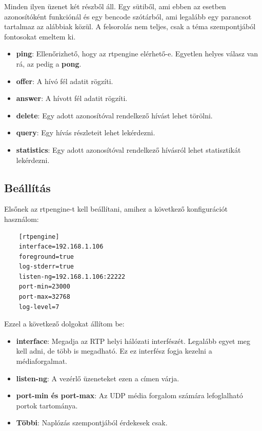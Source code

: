 Minden ilyen üzenet két részből áll. Egy sütiből, ami ebben az esetben azonosítóként
funkciónál és egy bencode szótárból, ami legalább egy parancsot tartalmaz az 
alábbiak közül. A felsorolás nem teljes, csak a téma szempontjából fontosokat 
emeltem ki.

\begin{itemize}
	\item \textbf{ping}: Ellenőrizhető, hogy az rtpengine elérhető-e. Egyetlen helyes 
	válasz van rá, az pedig a \textbf{pong}.
	\item \textbf{offer}: A hívó fél adatit rögzíti.
	\item \textbf{answer}: A hívott fél adatit rögzíti. 
	\item \textbf{delete}: Egy adott azonosítóval rendelkező hívást lehet törölni.
	\item \textbf{query}: Egy hívás részleteit lehet lekérdezni. 
	\item \textbf{statistics}: Egy adott azonosítóval rendelkező hívásról lehet statisztikát
	lekérdezni. 
\end{itemize} 

\subsection{Beállítás}

Elsőnek az rtpengine-t kell beállítani, amihez a következő konfigurációt 
használom: 

\begin{lstlisting}
	[rtpengine]
	interface=192.168.1.106
	foreground=true
	log-stderr=true
	listen-ng=192.168.1.106:22222
	port-min=23000
	port-max=32768
	log-level=7
\end{lstlisting}

Ezzel a következő dolgokat állítom be: 

\begin{itemize}
	\item \textbf{interface}: Megadja az RTP helyi hálózati interfészét. Legalább
	egyet meg kell adni, de több is megadható. Ez ez interfész fogja kezelni a 
	médiaforgalmat. 
	\item \textbf{listen-ng}: A vezérlő üzeneteket ezen a címen várja. 
	\item \textbf{port-min és port-max}: Az UDP média forgalom számára lefoglalható
	portok tartománya. 
	\item \textbf{Többi}: Naplózás szempontjából érdekesek csak. 
\end{itemize}

